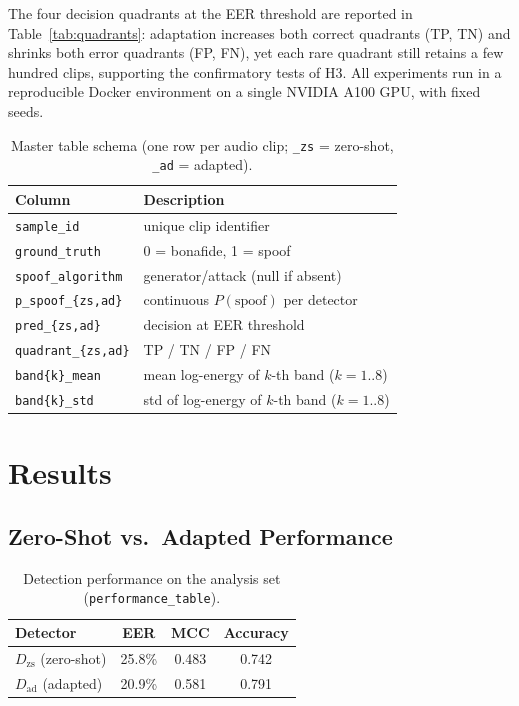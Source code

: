 \documentclass[sigconf]{acmart}
\begin{document}
The four decision quadrants at the EER threshold are reported in
Table~\ref{tab:quadrants}: adaptation increases both correct quadrants (TP, TN) and
shrinks both error quadrants (FP, FN), yet each rare quadrant still retains a few
hundred clips, supporting the confirmatory tests of H3. All experiments run in a
reproducible Docker environment on a single NVIDIA A100 GPU, with fixed seeds.

\begin{table}[t]
  \caption{Master table schema (one row per audio clip; \texttt{\_zs} = zero-shot,
  \texttt{\_ad} = adapted).}
  \label{tab:master}
  \begin{tabular}{ll}
    \toprule
    Column & Description \\
    \midrule
    \texttt{sample\_id} & unique clip identifier \\
    \texttt{ground\_truth} & 0 = bonafide, 1 = spoof \\
    \texttt{spoof\_algorithm} & generator/attack (null if absent) \\
    \texttt{p\_spoof\_\{zs,ad\}} & continuous $P(\mathrm{spoof})$ per detector \\
    \texttt{pred\_\{zs,ad\}} & decision at EER threshold \\
    \texttt{quadrant\_\{zs,ad\}} & TP / TN / FP / FN \\
    \texttt{band\{k\}\_mean} & mean log-energy of $k$-th band ($k=1..8$) \\
    \texttt{band\{k\}\_std} & std of log-energy of $k$-th band ($k=1..8$) \\
    \bottomrule
  \end{tabular}
\end{table}

\section{Results}
\subsection{Zero-Shot vs.\ Adapted Performance}
\label{sec:results-perf}
\begin{table}[t]
  \caption{Detection performance on the analysis set
  (\texttt{performance\_table}).}
  \label{tab:performance}
  \begin{tabular}{lccc}
    \toprule
    Detector & EER & MCC & Accuracy \\
    \midrule
    $D_\mathrm{zs}$ (zero-shot) & 25.8\% & 0.483 & 0.742 \\
    $D_\mathrm{ad}$ (adapted)   & 20.9\% & 0.581 & 0.791 \\
    \bottomrule
  \end{tabular}
\end{table}
\end{document}
